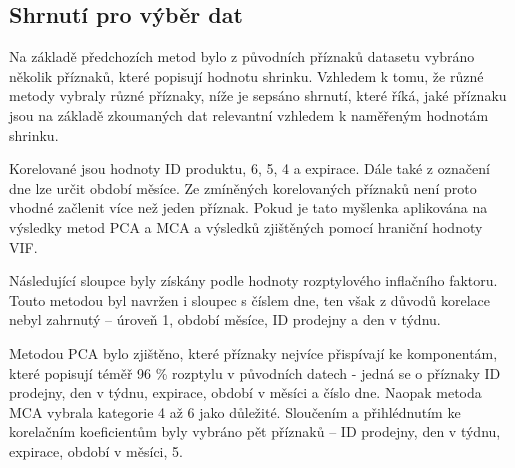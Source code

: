 \subsection*{Shrnutí pro výběr dat}

Na základě předchozích metod bylo z  původních příznaků datasetu 
vybráno několik příznaků, které popisují hodnotu shrinku.
Vzhledem k tomu, že různé metody vybraly různé příznaky, níže je sepsáno shrnutí, které říká, jaké příznaku jsou na základě zkoumaných dat relevantní vzhledem k naměřeným hodnotám shrinku. 

Korelované jsou hodnoty ID produktu, 6, 5, 4 a expirace. Dále také z označení dne lze určit období měsíce. Ze zmíněných korelovaných příznaků není proto vhodné začlenit více než jeden příznak. Pokud je tato myšlenka aplikována na výsledky metod PCA a MCA a výsledků zjištěných pomocí hraniční hodnoty VIF.

Následující sloupce byly získány podle hodnoty rozptylového inflačního faktoru. Touto metodou byl navržen i sloupec s číslem dne, ten však z důvodů korelace nebyl zahrnutý -- úroveň 1, období měsíce, ID prodejny a den v týdnu.
    
Metodou PCA bylo zjištěno, které příznaky nejvíce přispívají ke komponentám, které popisují téměř 96 \% rozptylu v původních datech - jedná se o příznaky ID prodejny, den v týdnu, expirace, období v měsíci a číslo dne. Naopak metoda MCA vybrala kategorie 4 až 6 jako důležité. Sloučením a přihlédnutím ke korelačním koeficientům byly vybráno pět příznaků -- 
    ID prodejny, den v týdnu, expirace, období v měsíci, 5.

